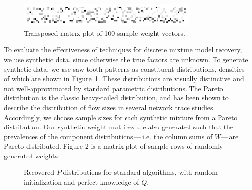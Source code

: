 \documentclass[conference]{IEEEtran}
\begin{document}
\begin{figure}[b]
\begin{center}
\includegraphics[width=3.5in]{synth/weights}
\end{center}
\vspace{-0.7em}
\caption{Transposed matrix plot of 100 sample weight vectors.}
\vspace{-0.3em}
\end{figure}

To evaluate the effectiveness of  techniques for discrete mixture model recovery, we use synthetic data, since otherwise the true factors are unknown.
To generate synthetic data, we use saw-tooth patterns as constituent distributions, densities of which are shown in Figure~1.
These distributions are visually distinctive and not well-approximated by standard parametric distributions.
The Pareto distribution is the classic heavy-tailed distribution, and has been shown to describe the distribution of flow sizes in several network trace studies.
Accordingly, we choose sample sizes for each synthetic mixture from a Pareto distribution.
Our synthetic weight matrices are also generated such that the prevalences of the component distributions\,---\,i.e. the column sums of $W$---\,are Pareto-distributed. Figure 2 is a matrix plot of sample rows of randomly generated weights.

\begin{figure}[t]
\begin{center}
\end{center}
\caption{Recovered $P$ distributions for standard  algorithms, with random initialization and perfect knowledge of $Q$.}
\end{figure}
\end{document}
